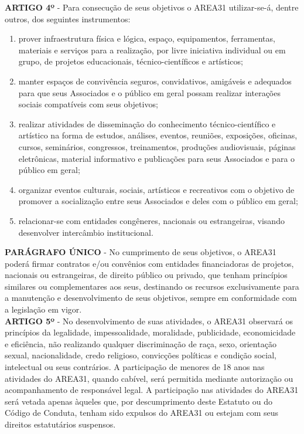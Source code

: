 \textbf{ARTIGO 4º} - Para consecução de seus objetivos o AREA31 utilizar-se-á, 
dentre outros, dos seguintes instrumentos:

\begin{enumerate}[label=\Roman* -]
    \item prover infraestrutura física e lógica, espaço, equipamentos, 
        ferramentas, materiais e serviços para a realização, 
        por livre iniciativa individual ou em grupo, de projetos educacionais,
        técnico-científicos e artísticos;
    \item manter espaços de convivência seguros, convidativos, amigáveis 
        e adequados para que seus Associados e o público em geral possam 
        realizar interações sociais compatíveis com seus objetivos;
    \item realizar atividades de disseminação do conhecimento 
        técnico-científico e artístico na forma de estudos, análises, 
        eventos, reuniões, exposições, oficinas, cursos, seminários, 
        congressos, treinamentos, produções audiovisuais, páginas eletrônicas,
        material informativo e publicações para seus Associados e para o 
        público em geral;
    \item organizar eventos culturais, sociais, artísticos e recreativos 
        com o objetivo de promover a socialização entre seus Associados 
        e deles com o público em geral; 
    \item relacionar-se com entidades congêneres, nacionais ou 
        estrangeiras, visando desenvolver intercâmbio institucional.
\end{enumerate}


\textbf{PARÁGRAFO ÚNICO} - No cumprimento de seus objetivos, o AREA31 poderá 
firmar contratos e/ou convênios com entidades financiadoras de projetos, 
nacionais ou estrangeiras, de direito público ou privado, que tenham 
princípios similares ou complementares aos seus, destinando os recursos 
exclusivamente para a manutenção e desenvolvimento de seus objetivos, 
sempre em conformidade com a legislação em vigor.
\\

\textbf{ARTIGO 5º} - No desenvolvimento de suas atividades, o AREA31 
observará os princípios da legalidade, impessoalidade, moralidade, 
publicidade, economicidade e eficiência, não realizando qualquer 
discriminação de raça, sexo, orientação sexual, nacionalidade, 
credo religioso, convicções políticas e condição social, intelectual ou 
seus contrários.
A participação de menores de 18 anos nas atividades do AREA31, quando cabível,
será permitida mediante autorização ou acompanhamento de responsável legal.
A participação nas atividades do AREA31 será vetada apenas àqueles que, 
por descumprimento deste Estatuto ou do Código de Conduta, tenham sido 
expulsos do AREA31 ou estejam com seus direitos estatutários suspensos.
